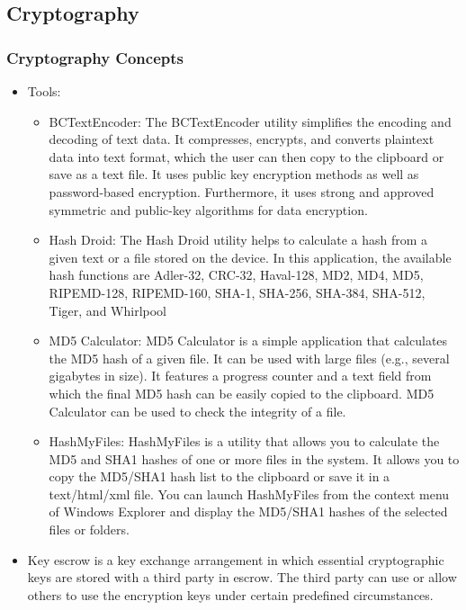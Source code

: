 \subsection{Cryptography}
\subsubsection{Cryptography Concepts}
\begin{itemize}
    \item Tools:
    \begin{itemize}
        \item BCTextEncoder: The BCTextEncoder utility simplifies the encoding and decoding of text data. It compresses, encrypts, and converts plaintext data into text format, which the user can then copy to the clipboard or save as a text file. It uses public key encryption methods as well as password-based encryption. Furthermore, it uses strong and approved symmetric and public-key algorithms for data encryption.
        \item Hash Droid: The Hash Droid utility helps to calculate a hash from a given text or a file stored on the device. In this application, the available hash functions are Adler-32, CRC-32, Haval-128, MD2, MD4, MD5, RIPEMD-128, RIPEMD-160, SHA-1, SHA-256, SHA-384, SHA-512, Tiger, and Whirlpool
        \item MD5 Calculator: MD5 Calculator is a simple application that calculates the MD5 hash of a given file. It can be used with large files (e.g., several gigabytes in size). It features a progress counter and a text field from which the final MD5 hash can be easily copied to the clipboard. MD5 Calculator can be used to check the integrity of a file.
        \item HashMyFiles: HashMyFiles is a utility that allows you to calculate the MD5 and SHA1 hashes of one or more files in the system. It allows you to copy the MD5/SHA1 hash list to the clipboard or save it in a text/html/xml file. You can launch HashMyFiles from the context menu of Windows Explorer and display the MD5/SHA1 hashes of the selected files or folders.
    \end{itemize}
    \item Key escrow is a key exchange arrangement in which essential cryptographic keys are stored with a third party in escrow. The third party can use or allow others to use the encryption keys under certain predefined circumstances.
\end{itemize}
